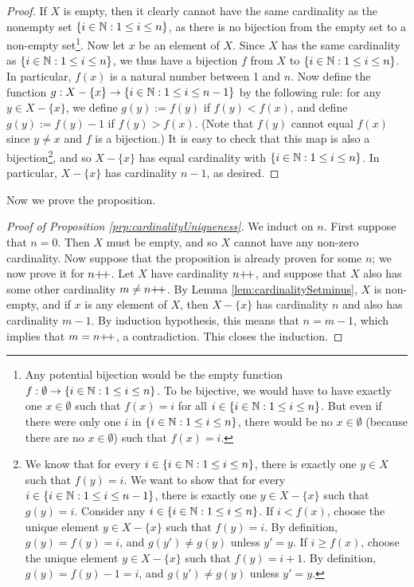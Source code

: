 \documentclass[../main.tex]{subfiles}
\begin{document}
\begin{itemize}
\begin{lem}
        \begin{proof}
            If $X$ is empty, then it clearly cannot have the same cardinality as the nonempty set $\{i\in\mathbb{N}:1\leq i\leq n\}$, as there is no bijection from the empty set to a non-empty set\footnote{Any potential bijection would be the empty function $f:\emptyset\to\{i\in\mathbb{N}:1\leq i\leq n\}$. To be bijective, we would have to have exactly one $x\in\emptyset$ such that $f(x)=i$ for all $i\in\{i\in\mathbb{N}:1\leq i\leq n\}$. But even if there were only one $i$ in $\{i\in\mathbb{N}:1\leq i\leq n\}$, there would be no $x\in\emptyset$ (because there are no $x\in\emptyset$) such that $f(x)=i$.}. Now let $x$ be an element of $X$. Since $X$ has the same cardinality as $\{i\in\mathbb{N}:1\leq i\leq n\}$, we thus have a bijection $f$ from $X$ to $\{i\in\mathbb{N}:1\leq i\leq n\}$. In particular, $f(x)$ is a natural number between 1 and $n$. Now define the function $g:X-\{x\}\to\{i\in\mathbb{N}:1\leq i\leq n-1\}$ by the following rule: for any $y\in X-\{x\}$, we define $g(y):=f(y)$ if $f(y)<f(x)$, and define $g(y):=f(y)-1$ if $f(y)>f(x)$. (Note that $f(y)$ cannot equal $f(x)$ since $y\neq x$ and $f$ is a bijection.) It is easy to check that this map is also a bijection\footnote{We know that for every $i\in\{i\in\mathbb{N}:1\leq i\leq n\}$, there is exactly one $y\in X$ such that $f(y)=i$. We want to show that for every $i\in\{i\in\mathbb{N}:1\leq i\leq n-1\}$, there is exactly one $y\in X-\{x\}$ such that $g(y)=i$. Consider any $i\in\{i\in\mathbb{N}:1\leq i\leq n\}$. If $i<f(x)$, choose the unique element $y\in X-\{x\}$ such that $f(y)=i$. By definition, $g(y)=f(y)=i$, and $g(y')\neq g(y)$ unless $y'=y$. If $i\geq f(x)$, choose the unique element $y\in X-\{x\}$ such that $f(y)=i+1$. By definition, $g(y)=f(y)-1=i$, and $g(y')\neq g(y)$ unless $y'=y$.}, and so $X-\{x\}$ has equal cardinality with $\{i\in\mathbb{N}:1\leq i\leq n\}$. In particular, $X-\{x\}$ has cardinality $n-1$, as desired.
        \end{proof}
    \end{lem}
    Now we prove the proposition.
    \begin{proof}[Proof of Proposition \ref{prp:cardinalityUniqueness}]
        We induct on $n$. First suppose that $n=0$. Then $X$ must be empty, and so $X$ cannot have any non-zero cardinality. Now suppose that the proposition is already proven for some $n$; we now prove it for $n{+\!+}$. Let $X$ have cardinality $n{+\!+}$, and suppose that $X$ also has some other cardinality $m\neq n{+\!+}$. By Lemma \ref{lem:cardinalitySetminus}, $X$ is non-empty, and if $x$ is any element of $X$, then $X-\{x\}$ has cardinality $n$ and also has cardinality $m-1$. By induction hypothesis, this means that $n=m-1$, which implies that $m=n{+\!+}$, a contradiction. This closes the induction.

\end{proof}
\end{itemize}
\end{document}

